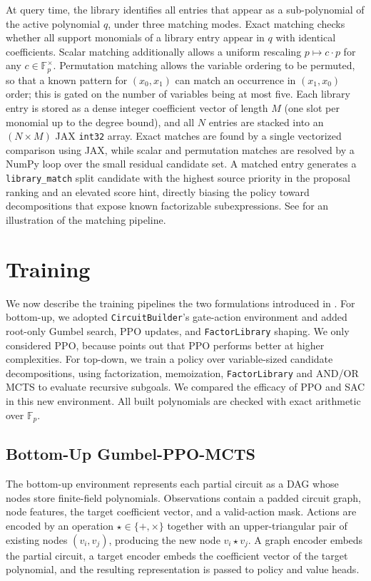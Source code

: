 \documentclass{article}
\theoremstyle{definition}
\theoremstyle{remark}
\begin{document}
At query time, the library identifies all entries that appear as a sub-polynomial of the active polynomial $q$, under three matching modes. Exact matching checks whether all support monomials of a library entry appear in $q$ with identical coefficients. Scalar matching additionally allows a uniform rescaling $p \mapsto c \cdot p$ for any $c \in \mathbb{F}_p^\times$. Permutation matching allows the variable ordering to be permuted, so that a known pattern for $(x_0, x_1)$ can match an occurrence in $(x_1, x_0)$ order; this is gated on the number of variables being at most five. Each library entry is stored as a dense integer coefficient vector of length $M$ (one slot per monomial up to the degree bound), and all $N$ entries are stacked into an $(N \times M)$ JAX \texttt{int32} array. Exact matches are found by a single vectorized comparison using JAX, while scalar and permutation matches are resolved by a NumPy loop over the small residual candidate set. A matched entry generates a \texttt{library\_match} split candidate with the highest source priority in the proposal ranking and an elevated score hint, directly biasing the policy toward decompositions that expose known factorizable subexpressions. See  for an illustration of the matching pipeline.


\section{Training}
\label{sec:training}

We now describe the training pipelines the two formulations introduced in . For bottom-up, we adopted \texttt{CircuitBuilder}'s gate-action environment and added root-only Gumbel search, PPO updates, and \texttt{FactorLibrary} shaping. We only considered PPO, because \citet{Zhang2026CircuitBuilder} points out that PPO performs better at higher complexities. For top-down, we train a policy over variable-sized candidate decompositions, using factorization, memoization, \texttt{FactorLibrary} and AND/OR MCTS to evaluate recursive subgoals. We compared the efficacy of PPO and SAC in this new environment. All built polynomials are checked with exact arithmetic over $\mathbb F_p$.

\subsection{Bottom-Up Gumbel-PPO-MCTS}

The bottom-up environment represents each partial circuit as a DAG whose nodes store finite-field polynomials. Observations contain a padded circuit graph, node features, the target coefficient vector, and a valid-action mask. Actions are encoded by an operation $\star\in\{+,\times\}$ together with an upper-triangular pair of existing nodes $(v_i,v_j)$, producing the new node $v_i\star v_j$. A graph encoder embeds the partial circuit, a target encoder embeds the coefficient vector of the target polynomial, and the resulting representation is passed to policy and value heads.
\end{document}
